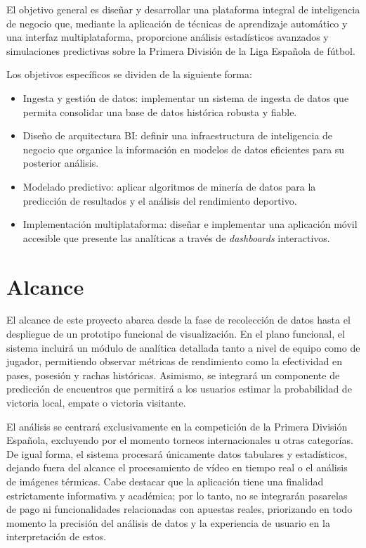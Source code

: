 El objetivo general es diseñar y desarrollar una plataforma integral de inteligencia de negocio que, mediante la aplicación de técnicas de aprendizaje automático y una interfaz multiplataforma, proporcione análisis estadísticos avanzados y simulaciones predictivas sobre la Primera División de la Liga Española de fútbol.

Los objetivos específicos se dividen de la siguiente forma:
\begin{itemize}
    \item Ingesta y gestión de datos: implementar un sistema de ingesta de datos que permita consolidar una base de datos histórica robusta y fiable.
    \item Diseño de arquitectura BI: definir una infraestructura de inteligencia de negocio que organice la información en modelos de datos eficientes para su posterior análisis.
    \item Modelado predictivo: aplicar algoritmos de minería de datos para la predicción de resultados y el análisis del rendimiento deportivo.
    \item Implementación multiplataforma: diseñar e implementar una aplicación móvil accesible que presente las analíticas a través de \textit{dashboards} interactivos.
\end{itemize}
\section{Alcance}

El alcance de este proyecto abarca desde la fase de recolección de datos hasta el despliegue de un prototipo funcional de visualización. En el plano funcional, el sistema incluirá un módulo de analítica detallada tanto a nivel de equipo como de jugador, permitiendo observar métricas de rendimiento como la efectividad en pases, posesión y rachas históricas. Asimismo, se integrará un componente de predicción de encuentros que permitirá a los usuarios estimar la probabilidad de victoria local, empate o victoria visitante.


El análisis se centrará exclusivamente en la competición de la Primera División Española, excluyendo por el momento torneos internacionales u otras categorías. De igual forma, el sistema procesará únicamente datos tabulares y estadísticos, dejando fuera del alcance el procesamiento de vídeo en tiempo real o el análisis de imágenes térmicas. Cabe destacar que la aplicación tiene una finalidad estrictamente informativa y académica; por lo tanto, no se integrarán pasarelas de pago ni funcionalidades relacionadas con apuestas reales, priorizando en todo momento la precisión del análisis de datos y la experiencia de usuario en la interpretación de estos.


